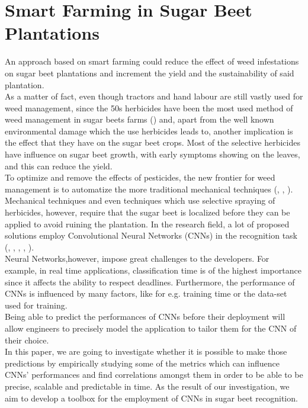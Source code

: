 \section{Smart Farming in Sugar Beet Plantations}
An approach based on smart farming could reduce the effect of weed infestations on sugar beet plantations and  increment the yield and the sustainability of said plantation.\\
As a matter of fact, even though tractors and hand labour are still vastly used for weed management, since the 50s herbicides have been the most used method of weed management in sugar beets farms (\cite{cioni_weed_2010}) and, apart from the well known environmental damage which the use herbicides leads to, another implication is the effect that they have on the sugar beet crops. Most of the selective herbicides have influence on sugar beet growth, with early symptoms showing on the leaves, and this can reduce the yield. \cite{petersen_review_2004}\\
To optimize and remove the effects of pesticides, the new frontier for weed management is to automatize the more traditional mechanical techniques (\cite{raja_real-time_2020}, \cite{frasconi_design_2014}, \cite{machleb_sensor-based_2021}).\\
Mechanical techniques and even techniques which use selective spraying of herbicides, however, require that the sugar beet is localized before they can be applied to avoid ruining the plantation. In the research field, a lot of proposed solutions employ Convolutional Neural Networks (CNNs) in the recognition task (\cite{gao_deep_2020}, \cite{suh_transfer_2018}, \cite{ramirez_deep_2020},  \cite{milioto2017real}, \cite{agriculture11111111}).\\
Neural Networks,however, impose great challenges to the developers. For example, in real time applications, classification time is of the highest importance since it affects the ability to respect deadlines. Furthermore, the performance of CNNs is influenced by many factors, like for e.g. training time or the data-set used for training.\\ %
Being able to predict the performances of CNNs before their deployment will allow engineers to precisely model the application to tailor them for the CNN of their choice. \\
In this paper, we are going to investigate whether it is possible to make those predictions by empirically studying some of the metrics which can influence CNNs' performances and find correlations amongst them in order to be able to be precise, scalable and predictable in time. As the result of our investigation, we aim to develop a toolbox for the employment of CNNs in sugar beet recognition.

